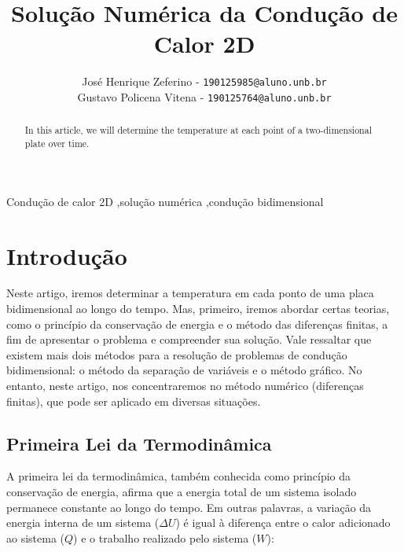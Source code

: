 \documentclass[final,5p,times,twocolumn]{elsarticle}
\begin{document}
\begin{frontmatter}

\title{Solução Numérica da Condução de Calor 2D}

\author{José Henrique Zeferino - {\tt\small 190125985@aluno.unb.br}\\
Gustavo Policena Vitena - {\tt\small 190125764@aluno.unb.br}\\
}
\address{Universidade de Brasília}


\address[mymainaddress]{Campus Universitário Darcy Ribeiro, Faculdade de Tecnologia - Asa Norte, Brasília - DF, 70910-900}

\begin{abstract}
    In this article, we will determine the temperature at each point of a two-dimensional plate over time.
\end{abstract}

\begin{keyword}
Condução de calor 2D \sep solução numérica \sep condução bidimensional
\end{keyword}

\end{frontmatter}

\linenumbers
\section{Introdução}
\label{sec:Introdução}

Neste artigo, iremos determinar a temperatura em cada ponto de uma placa bidimensional ao longo do tempo. Mas, primeiro, iremos abordar certas teorias, como o princípio da conservação de energia e o método das diferenças finitas, a fim de apresentar o problema e compreender sua solução. Vale ressaltar que existem mais dois métodos para a resolução de problemas de condução bidimensional: o método da separação de variáveis e o método gráfico. No entanto, neste artigo, nos concentraremos no método numérico (diferenças finitas), que pode ser aplicado em diversas situações.

\subsection{Primeira Lei da Termodinâmica}
\label{sec:1 Lei da termodinamica}

A primeira lei da termodinâmica, também conhecida como princípio da conservação de energia, afirma que a energia total de um sistema isolado permanece constante ao longo do tempo. Em outras palavras, a variação da energia interna de um sistema ($\Delta U$) é igual à diferença entre o calor adicionado ao sistema ($Q$) e o trabalho realizado pelo sistema ($W$):
\end{document}
